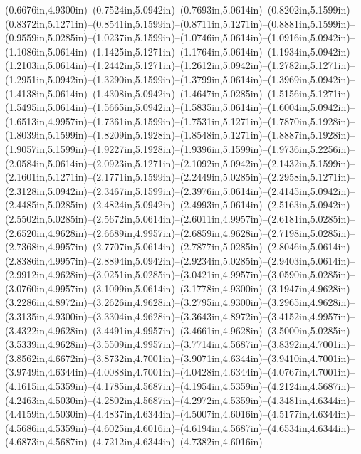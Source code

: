 (0.6676in,4.9300in)--(0.7524in,5.0942in)--(0.7693in,5.0614in)--(0.8202in,5.1599in)--(0.8372in,5.1271in)--(0.8541in,5.1599in)--(0.8711in,5.1271in)--(0.8881in,5.1599in)--(0.9559in,5.0285in)--(1.0237in,5.1599in)--(1.0746in,5.0614in)--(1.0916in,5.0942in)--(1.1086in,5.0614in)--(1.1425in,5.1271in)--(1.1764in,5.0614in)--(1.1934in,5.0942in)--(1.2103in,5.0614in)--(1.2442in,5.1271in)--(1.2612in,5.0942in)--(1.2782in,5.1271in)--(1.2951in,5.0942in)--(1.3290in,5.1599in)--(1.3799in,5.0614in)--(1.3969in,5.0942in)--(1.4138in,5.0614in)--(1.4308in,5.0942in)--(1.4647in,5.0285in)--(1.5156in,5.1271in)--(1.5495in,5.0614in)--(1.5665in,5.0942in)--(1.5835in,5.0614in)--(1.6004in,5.0942in)--(1.6513in,4.9957in)--(1.7361in,5.1599in)--(1.7531in,5.1271in)--(1.7870in,5.1928in)--(1.8039in,5.1599in)--(1.8209in,5.1928in)--(1.8548in,5.1271in)--(1.8887in,5.1928in)--(1.9057in,5.1599in)--(1.9227in,5.1928in)--(1.9396in,5.1599in)--(1.9736in,5.2256in)--(2.0584in,5.0614in)--(2.0923in,5.1271in)--(2.1092in,5.0942in)--(2.1432in,5.1599in)--(2.1601in,5.1271in)--(2.1771in,5.1599in)--(2.2449in,5.0285in)--(2.2958in,5.1271in)--(2.3128in,5.0942in)--(2.3467in,5.1599in)--(2.3976in,5.0614in)--(2.4145in,5.0942in)--(2.4485in,5.0285in)--(2.4824in,5.0942in)--(2.4993in,5.0614in)--(2.5163in,5.0942in)--(2.5502in,5.0285in)--(2.5672in,5.0614in)--(2.6011in,4.9957in)--(2.6181in,5.0285in)--(2.6520in,4.9628in)--(2.6689in,4.9957in)--(2.6859in,4.9628in)--(2.7198in,5.0285in)--(2.7368in,4.9957in)--(2.7707in,5.0614in)--(2.7877in,5.0285in)--(2.8046in,5.0614in)--(2.8386in,4.9957in)--(2.8894in,5.0942in)--(2.9234in,5.0285in)--(2.9403in,5.0614in)--(2.9912in,4.9628in)--(3.0251in,5.0285in)--(3.0421in,4.9957in)--(3.0590in,5.0285in)--(3.0760in,4.9957in)--(3.1099in,5.0614in)--(3.1778in,4.9300in)--(3.1947in,4.9628in)--(3.2286in,4.8972in)--(3.2626in,4.9628in)--(3.2795in,4.9300in)--(3.2965in,4.9628in)--(3.3135in,4.9300in)--(3.3304in,4.9628in)--(3.3643in,4.8972in)--(3.4152in,4.9957in)--(3.4322in,4.9628in)--(3.4491in,4.9957in)--(3.4661in,4.9628in)--(3.5000in,5.0285in)--(3.5339in,4.9628in)--(3.5509in,4.9957in)--(3.7714in,4.5687in)--(3.8392in,4.7001in)--(3.8562in,4.6672in)--(3.8732in,4.7001in)--(3.9071in,4.6344in)--(3.9410in,4.7001in)--(3.9749in,4.6344in)--(4.0088in,4.7001in)--(4.0428in,4.6344in)--(4.0767in,4.7001in)--(4.1615in,4.5359in)--(4.1785in,4.5687in)--(4.1954in,4.5359in)--(4.2124in,4.5687in)--(4.2463in,4.5030in)--(4.2802in,4.5687in)--(4.2972in,4.5359in)--(4.3481in,4.6344in)--(4.4159in,4.5030in)--(4.4837in,4.6344in)--(4.5007in,4.6016in)--(4.5177in,4.6344in)--(4.5686in,4.5359in)--(4.6025in,4.6016in)--(4.6194in,4.5687in)--(4.6534in,4.6344in)--(4.6873in,4.5687in)--(4.7212in,4.6344in)--(4.7382in,4.6016in) 